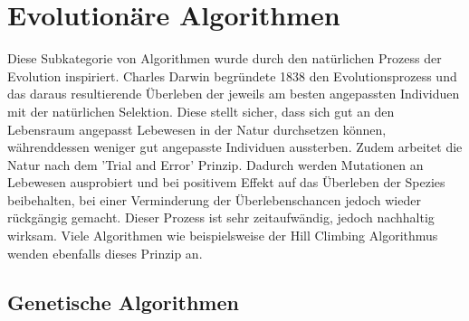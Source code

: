 \chapter{Evolutionäre Algorithmen}

Diese Subkategorie von Algorithmen wurde durch den natürlichen Prozess der Evolution
inspiriert. Charles Darwin begründete 1838 den Evolutionsprozess und das daraus resultierende
Überleben der jeweils am besten angepassten Individuen mit der natürlichen Selektion.
Diese stellt sicher, dass sich gut an den Lebensraum angepasst Lebewesen in der Natur
durchsetzen können, währenddessen weniger gut angepasste Individuen aussterben. Zudem
arbeitet die Natur nach dem 'Trial and Error' Prinzip. Dadurch werden Mutationen an
Lebewesen ausprobiert und bei positivem Effekt auf das Überleben der Spezies beibehalten,
bei einer Verminderung der Überlebenschancen jedoch wieder rückgängig gemacht. Dieser Prozess
ist sehr zeitaufwändig, jedoch nachhaltig wirksam. Viele Algorithmen wie beispielsweise
der Hill Climbing Algorithmus wenden ebenfalls dieses Prinzip an.

\section{Genetische Algorithmen}

